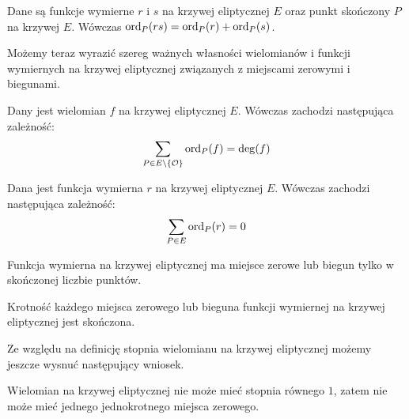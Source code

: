 \begin{theorem}
Dane są funkcje wymierne $r$ i $s$ na krzywej eliptycznej $E$
oraz punkt skończony $P$ na krzywej $E$.
Wówczas $\operatorname{ord}_P(rs) = \operatorname{ord}_P(r) + \operatorname{ord}_P(s)$.
\end{theorem}

\noindent
Możemy teraz wyrazić szereg ważnych własności
wielomianów i funkcji wymiernych na krzywej eliptycznej
związanych z miejscami zerowymi i biegunami.

\begin{theorem}\label{polynomial_ord_deg_theorem}
Dany jest wielomian $f$ na krzywej eliptycznej $E$.
Wówczas zachodzi następująca zależność:
\begin{equation*}
\sum_{P \in E\setminus \{\mathcal{O}\}} \operatorname{ord}_P(f) = \deg(f)
\end{equation*}
\end{theorem}

\begin{corollary}\label{function_order_sum_zero_corollary}
Dana jest funkcja wymierna $r$ na krzywej eliptycznej $E$.
Wówczas zachodzi następująca zależność:
\begin{equation*}
\sum_{P \in E} \operatorname{ord}_P(r) = 0
\end{equation*}
\end{corollary}

\begin{corollary}
Funkcja wymierna na krzywej eliptycznej ma miejsce zerowe lub biegun
tylko w skończonej liczbie punktów.
\end{corollary}

\begin{corollary}
Krotność każdego miejsca zerowego lub bieguna
funkcji wymiernej na krzywej eliptycznej
jest skończona.
\end{corollary}

\noindent
Ze względu na definicję stopnia wielomianu na krzywej eliptycznej
możemy jeszcze wysnuć następujący wniosek.

\begin{corollary}\label{poly_no_single_zero_corollary}
Wielomian na krzywej eliptycznej nie może mieć stopnia równego $1$,
zatem nie może mieć jednego jednokrotnego miejsca zerowego.
\end{corollary}
